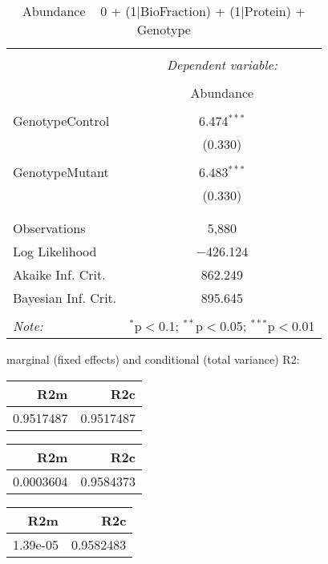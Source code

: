 \documentclass[11pt]{report}
\begin{document}
\begin{table}[!htbp] \centering 
  \caption{Abundance ~ 0 + (1|BioFraction) + (1|Protein) + Genotype} 
  \label{} 
\begin{tabular}{@{\extracolsep{5pt}}lc} 
\\[-1.8ex]\hline 
\hline \\[-1.8ex] 
 & \multicolumn{1}{c}{\textit{Dependent variable:}} \\ 
\cline{2-2} 
\\[-1.8ex] & Abundance \\ 
\hline \\[-1.8ex] 
 GenotypeControl & 6.474$^{***}$ \\ 
  & (0.330) \\ 
  & \\ 
 GenotypeMutant & 6.483$^{***}$ \\ 
  & (0.330) \\ 
  & \\ 
\hline \\[-1.8ex] 
Observations & 5,880 \\ 
Log Likelihood & $-$426.124 \\ 
Akaike Inf. Crit. & 862.249 \\ 
Bayesian Inf. Crit. & 895.645 \\ 
\hline 
\hline \\[-1.8ex] 
\textit{Note:}  & \multicolumn{1}{r}{$^{*}$p$<$0.1; $^{**}$p$<$0.05; $^{***}$p$<$0.01} \\ 
\end{tabular} 
\end{table} 
marginal (fixed effects) and conditional (total variance) R2:

\begin{tabular}{r|r}
\hline
R2m & R2c\\
\hline
0.9517487 & 0.9517487\\
\hline
\end{tabular}

\begin{tabular}{r|r}
\hline
R2m & R2c\\
\hline
0.0003604 & 0.9584373\\
\hline
\end{tabular}

\begin{tabular}{r|r}
\hline
R2m & R2c\\
\hline
1.39e-05 & 0.9582483\\
\hline
\end{tabular}
\end{document}

